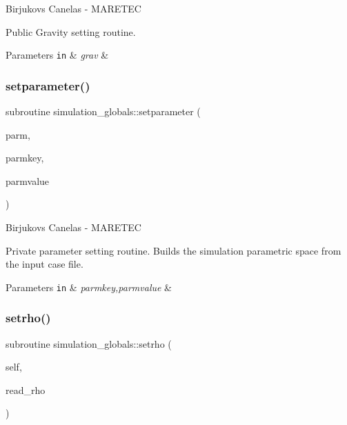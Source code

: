 Birjukovs Canelas -\/ M\+A\+R\+E\+T\+EC 

Public Gravity setting routine. 
\begin{DoxyParams}[1]{Parameters}
\mbox{\tt in}  & {\em grav} & \\
\hline
\end{DoxyParams}
\mbox{\label{namespacesimulation__globals_a541b7227b2876577661cf199d4e7a890}} 
\subsubsection{\texorpdfstring{setparameter()}{setparameter()}}
{\footnotesize\ttfamily subroutine simulation\+\_\+globals\+::setparameter (\begin{DoxyParamCaption}\item[{class(\mbox{\hyperlink{structsimulation__globals_1_1parameters__t}{parameters\+\_\+t}})}]{parm,  }\item[{type(string), intent(in)}]{parmkey,  }\item[{type(string), intent(in)}]{parmvalue }\end{DoxyParamCaption})\hspace{0.3cm}{\ttfamily [private]}}



Birjukovs Canelas -\/ M\+A\+R\+E\+T\+EC 

Private parameter setting routine. Builds the simulation parametric space from the input case file. 
\begin{DoxyParams}[1]{Parameters}
\mbox{\tt in}  & {\em parmkey,parmvalue} & \\
\hline
\end{DoxyParams}
\mbox{\label{namespacesimulation__globals_acfdc640757f0275bccb1d8de7bd7dc92}} 
\subsubsection{\texorpdfstring{setrho()}{setrho()}}
{\footnotesize\ttfamily subroutine simulation\+\_\+globals\+::setrho (\begin{DoxyParamCaption}\item[{class(\mbox{\hyperlink{structsimulation__globals_1_1constants__t}{constants\+\_\+t}})}]{self,  }\item[{type(string), intent(in)}]{read\+\_\+rho }\end{DoxyParamCaption})\hspace{0.3cm}{\ttfamily [private]}}



